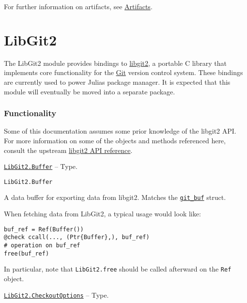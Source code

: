 For further information on artifacts, see \hyperlink{14074946843262554989}{Artifacts}.



\hypertarget{14272245692301851811}{}


\chapter{LibGit2}



The LibGit2 module provides bindings to \href{https://libgit2.org/}{libgit2}, a portable C library that implements core functionality for the \href{https://git-scm.com/}{Git} version control system. These bindings are currently used to power Julia{\textquotesingle}s package manager. It is expected that this module will eventually be moved into a separate package.



\hypertarget{13716495418266911399}{}


\subsection{Functionality}



Some of this documentation assumes some prior knowledge of the libgit2 API. For more information on some of the objects and methods referenced here, consult the upstream \href{https://libgit2.org/libgit2/\#v0.25.1}{libgit2 API reference}.


\hypertarget{6862256905288214016}{}
\hyperlink{6862256905288214016}{\texttt{LibGit2.Buffer}}  -- {Type.}

\begin{adjustwidth}{2em}{0pt}


\begin{verbatim}
LibGit2.Buffer
\end{verbatim}

A data buffer for exporting data from libgit2. Matches the \href{https://libgit2.org/libgit2/\#HEAD/type/git\_buf}{\texttt{git\_buf}} struct.

When fetching data from LibGit2, a typical usage would look like:


\begin{verbatim}
buf_ref = Ref(Buffer())
@check ccall(..., (Ptr{Buffer},), buf_ref)
# operation on buf_ref
free(buf_ref)
\end{verbatim}

In particular, note that \texttt{LibGit2.free} should be called afterward on the \texttt{Ref} object.



\end{adjustwidth}
\hypertarget{16441061243067746546}{}
\hyperlink{16441061243067746546}{\texttt{LibGit2.CheckoutOptions}}  -- {Type.}

